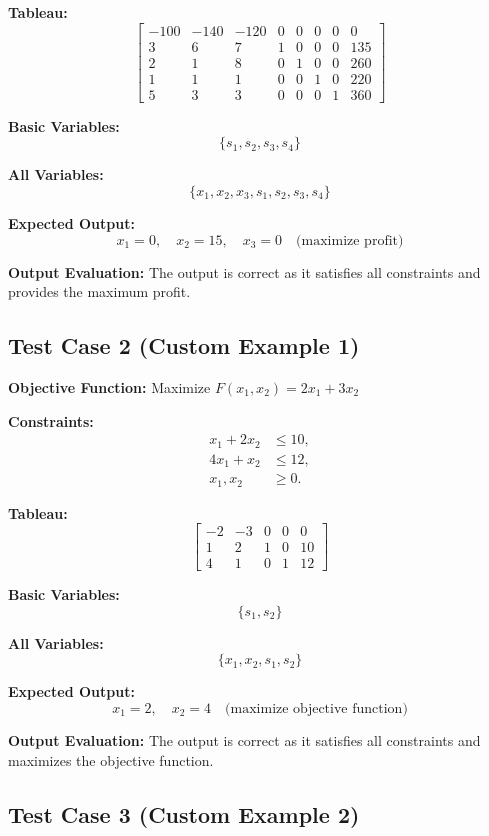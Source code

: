 \documentclass[12pt, legalpaper]{exam}
\begin{document}
\textbf{Tableau:}
\[
\begin{bmatrix}
-100 & -140 & -120 & 0 & 0 & 0 & 0 & 0 \\
3 & 6 & 7 & 1 & 0 & 0 & 0 & 135 \\
2 & 1 & 8 & 0 & 1 & 0 & 0 & 260 \\
1 & 1 & 1 & 0 & 0 & 1 & 0 & 220 \\
5 & 3 & 3 & 0 & 0 & 0 & 1 & 360
\end{bmatrix}
\]

\textbf{Basic Variables:}
\[
\{ s_1, s_2, s_3, s_4 \}
\]

\textbf{All Variables:}
\[
\{ x_1, x_2, x_3, s_1, s_2, s_3, s_4 \}
\]

\textbf{Expected Output:}
\[
x_1 = 0, \quad x_2 = 15, \quad x_3 = 0 \quad \text{(maximize profit)}
\]

\textbf{Output Evaluation:} The output is correct as it satisfies all constraints and provides the maximum profit.

\subsection*{Test Case 2 (Custom Example 1)}

\textbf{Objective Function:} Maximize \( F(x_1, x_2) = 2x_1 + 3x_2 \)

\textbf{Constraints:}
\[
\begin{aligned}
x_1 + 2x_2 &\leq 10, \\
4x_1 + x_2 &\leq 12, \\
x_1, x_2 &\geq 0.
\end{aligned}
\]

\textbf{Tableau:}
\[
\begin{bmatrix}
-2 & -3 & 0 & 0 & 0 \\
1 & 2 & 1 & 0 & 10 \\
4 & 1 & 0 & 1 & 12
\end{bmatrix}
\]

\textbf{Basic Variables:}
\[
\{ s_1, s_2 \}
\]

\textbf{All Variables:}
\[
\{ x_1, x_2, s_1, s_2 \}
\]

\textbf{Expected Output:}
\[
x_1 = 2, \quad x_2 = 4 \quad \text{(maximize objective function)}
\]

\textbf{Output Evaluation:} The output is correct as it satisfies all constraints and maximizes the objective function.

\subsection*{Test Case 3 (Custom Example 2)}
\end{document}
